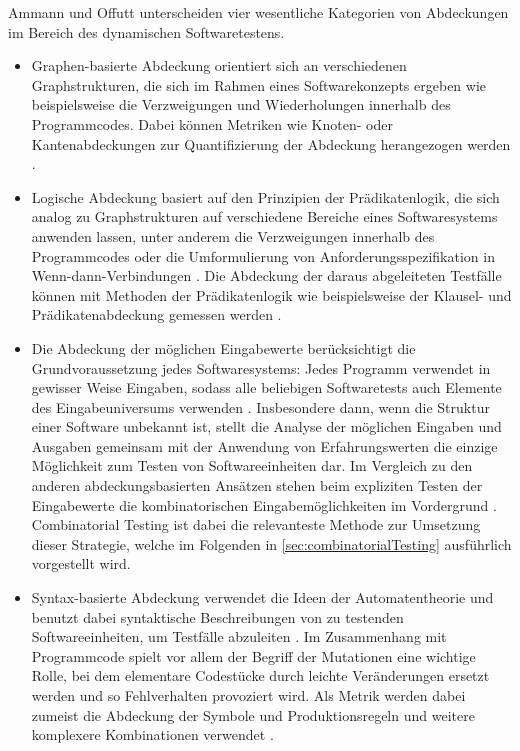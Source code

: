 Ammann und Offutt \cite{ammann2008introduction} unterscheiden vier wesentliche Kategorien von Abdeckungen im Bereich des dynamischen Softwaretestens. 
\begin{itemize}
\item Graphen-basierte Abdeckung orientiert sich an verschiedenen Graphstrukturen, die sich im Rahmen eines Softwarekonzepts ergeben wie beispielsweise die Verzweigungen und Wiederholungen innerhalb des Programmcodes. Dabei können Metriken wie Knoten- oder Kantenabdeckungen zur Quantifizierung der Abdeckung herangezogen werden \cite[S. 27 ff.]{ammann2008introduction}.
\item Logische Abdeckung basiert auf den Prinzipien der Prädikatenlogik, die sich analog zu Graphstrukturen auf verschiedene Bereiche eines Softwaresystems anwenden lassen, unter anderem die Verzweigungen innerhalb des Programmcodes oder die Umformulierung von Anforderungsspezifikation in Wenn-dann-Verbindungen \cite[S. 131 ff.]{ammann2008introduction}. Die Abdeckung der daraus abgeleiteten Testfälle können mit Methoden der Prädikatenlogik wie beispielsweise der Klausel- und Prädikatenabdeckung gemessen werden \cite[S. 106 ff.]{ammann2008introduction}.
\item Die Abdeckung der möglichen Eingabewerte berücksichtigt die Grundvoraussetzung jedes Softwaresystems: Jedes Programm verwendet in gewisser Weise Eingaben, sodass alle beliebigen Softwaretests auch Elemente des Eingabeuniversums verwenden \cite[S. 150]{ammann2008introduction}. Insbesondere dann, wenn die Struktur einer Software unbekannt ist, stellt die Analyse der möglichen Eingaben und Ausgaben gemeinsam mit der Anwendung von Erfahrungswerten die einzige Möglichkeit zum Testen von Softwareeinheiten dar. Im Vergleich zu den anderen abdeckungsbasierten Ansätzen stehen beim expliziten Testen der Eingabewerte die kombinatorischen Eingabemöglichkeiten im Vordergrund \cite[S. 150 ff.]{ammann2008introduction}. Combinatorial Testing ist dabei die relevanteste Methode zur Umsetzung dieser Strategie, welche im Folgenden in \autoref{sec:combinatorialTesting} ausführlich vorgestellt wird. 
\item Syntax-basierte Abdeckung verwendet die Ideen der Automatentheorie und benutzt dabei syntaktische Beschreibungen von zu testenden Softwareeinheiten, um Testfälle abzuleiten \cite[S. 170 ff.]{ammann2008introduction}. Im Zusammenhang mit Programmcode spielt vor allem der Begriff der Mutationen eine wichtige Rolle, bei dem elementare Codestücke durch leichte Veränderungen ersetzt werden und so Fehlverhalten provoziert wird. Als Metrik werden dabei zumeist die Abdeckung der Symbole und Produktionsregeln und weitere komplexere Kombinationen verwendet \cite[S. 172]{ammann2008introduction}.
\end{itemize}


